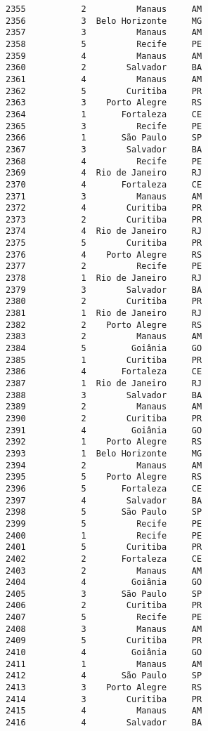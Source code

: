 \documentclass[11pt]{article}
\begin{document}
\begin{Verbatim}[commandchars=\\\{\}]
2355           2          Manaus     AM  
2356           3  Belo Horizonte     MG  
2357           3          Manaus     AM  
2358           5          Recife     PE  
2359           4          Manaus     AM  
2360           2        Salvador     BA  
2361           4          Manaus     AM  
2362           5        Curitiba     PR  
2363           3    Porto Alegre     RS  
2364           1       Fortaleza     CE  
2365           3          Recife     PE  
2366           1       São Paulo     SP  
2367           3        Salvador     BA  
2368           4          Recife     PE  
2369           4  Rio de Janeiro     RJ  
2370           4       Fortaleza     CE  
2371           3          Manaus     AM  
2372           4        Curitiba     PR  
2373           2        Curitiba     PR  
2374           4  Rio de Janeiro     RJ  
2375           5        Curitiba     PR  
2376           4    Porto Alegre     RS  
2377           2          Recife     PE  
2378           1  Rio de Janeiro     RJ  
2379           3        Salvador     BA  
2380           2        Curitiba     PR  
2381           1  Rio de Janeiro     RJ  
2382           2    Porto Alegre     RS  
2383           2          Manaus     AM  
2384           5         Goiânia     GO  
2385           1        Curitiba     PR  
2386           4       Fortaleza     CE  
2387           1  Rio de Janeiro     RJ  
2388           3        Salvador     BA  
2389           2          Manaus     AM  
2390           2        Curitiba     PR  
2391           4         Goiânia     GO  
2392           1    Porto Alegre     RS  
2393           1  Belo Horizonte     MG  
2394           2          Manaus     AM  
2395           5    Porto Alegre     RS  
2396           5       Fortaleza     CE  
2397           4        Salvador     BA  
2398           5       São Paulo     SP  
2399           5          Recife     PE  
2400           1          Recife     PE  
2401           5        Curitiba     PR  
2402           2       Fortaleza     CE  
2403           2          Manaus     AM  
2404           4         Goiânia     GO  
2405           3       São Paulo     SP  
2406           2        Curitiba     PR  
2407           5          Recife     PE  
2408           3          Manaus     AM  
2409           5        Curitiba     PR  
2410           4         Goiânia     GO  
2411           1          Manaus     AM  
2412           4       São Paulo     SP  
2413           3    Porto Alegre     RS  
2414           3        Curitiba     PR  
2415           4          Manaus     AM  
2416           4        Salvador     BA  

\end{Verbatim}
\end{document}
